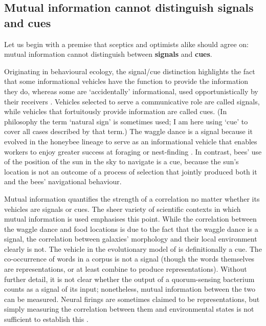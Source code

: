 \subsection{Mutual information cannot distinguish signals and cues}

Let us begin with a premise that sceptics and optimists alike should agree on: mutual information cannot distinguish between \textbf{signals} and \textbf{cues}.

Originating in behavioural ecology, the signal/cue distinction highlights the fact that some informational vehicles have the function to provide the information they do, whereas some are `accidentally' informational, used opportunistically by their receivers \citep[$\S$1.2]{maynardsmith2003animal}.
Vehicles selected to serve a communicative role are called signals, while vehicles that fortuitously provide information are called cues.
(In philosophy the term `natural sign' is sometimes used; I am here using `cue' to cover all cases described by that term.)
The waggle dance is a signal because it evolved in the honeybee lineage to serve as an informational vehicle that enables workers to enjoy greater success at foraging or nest-finding \citep{gould1975honey,riley2005flight}.
In contrast, bees' use of the position of the sun in the sky to navigate is a cue, because the sun's location is not an outcome of a process of selection that jointly produced both it and the bees' navigational behaviour.

Mutual information quantifies the strength of a correlation no matter whether its vehicles are signals or cues.
The sheer variety of scientific contexts in which mutual information is used emphasises this point.
While the correlation between the waggle dance and food locations is due to the fact that the waggle dance is a signal, the correlation between galaxies' morphology and their local environment clearly is not.
The vehicle in the evolutionary model of \citet{donaldson-matasci2010fitness} is definitionally a cue.
The co-occurrence of words in a corpus is not a signal (though the words themselves are representations, or at least combine to produce representations).
Without further detail, it is not clear whether the output of a quorum-sensing bacterium counts as a signal of its input; nonetheless, mutual information between the two can be measured.
Neural firings are sometimes claimed to be representations, but simply measuring the correlation between them and environmental states is not sufficient to establish this \citep{rathkopf2017neural}.

